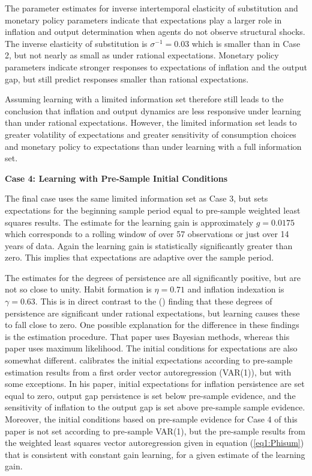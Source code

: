 \documentclass[11pt]{article}
\newcommand{\citee}[1]{\citeauthor*{#1} (\citeyear{#1})}
\begin{document}
The parameter estimates for inverse intertemporal elasticity of substitution and monetary policy parameters indicate that expectations play a larger role in inflation and output determination when agents do not observe structural shocks.  The inverse elasticity of substitution is $\sigma^{-1}=0.03$ which is smaller than in Case 2, but not nearly as small as under rational expectations.  Monetary policy parameters indicate stronger responses to expectations of inflation and the output gap, but still predict responses smaller than rational expectations.  

Assuming learning with a limited information set therefore still leads to the conclusion that inflation and output dynamics are less responsive under learning than under rational expectations.  However, the limited information set leads to greater volatility of expectations and greater sensitivity of consumption choices and monetary policy to expectations than under learning with a full information set.

\noindent \textbf{Case 4:  Learning with Pre-Sample Initial Conditions} 

The final case uses the same limited information set as Case 3, but sets expectations for the beginning sample period equal to pre-sample weighted least squares results.  The estimate for the learning gain is approximately $g=0.0175$ which corresponds to a rolling window of over 57 observations or just over 14 years of data.  Again the learning gain is statistically significantly greater than zero.  This implies that expectations are adaptive over the sample period.  

The estimates for the degrees of persistence are all significantly positive, but are not so close to unity.  Habit formation is $\eta=0.71$ and inflation indexation is $\gamma=0.63$.  This is in direct contrast to the \citee{milani2007} finding that these degrees of persistence are significant under rational expectations, but learning causes these to fall close to zero.  One possible explanation for the difference in these findings is the estimation procedure.  That paper uses Bayesian methods, whereas this paper uses maximum likelihood.  The initial conditions for expectations are also somewhat different.  \citeauthor*{milani2007} calibrates the initial expectations according to pre-sample estimation results from a first order vector autoregression (VAR(1)), but with some exceptions.  In his paper, initial expectations for inflation persistence are set equal to zero, output gap persistence is set below pre-sample evidence, and the sensitivity of inflation to the output gap is set above pre-sample sample evidence.  Moreover, the initial conditions based on pre-sample evidence for Case 4 of this paper is not set according to pre-sample VAR(1), but the pre-sample results from the weighted least squares vector autoregression given in equation (\ref{eq1:Phisum}) that is consistent with constant gain learning, for a given estimate of the learning gain.
\end{document}
